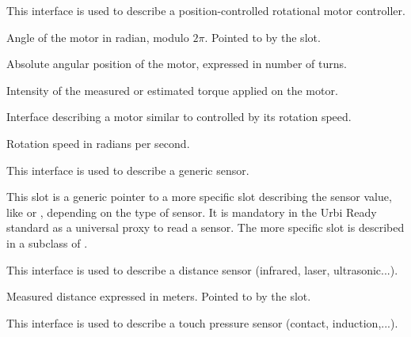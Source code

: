 

This interface is used to describe a position-controlled rotational motor controller.

\begin{slots}
  {%
    Angle of the motor in radian, modulo $2\pi$. Pointed to by the
     slot.%
  }

  {%
    Absolute angular position of the motor, expressed in number of
    turns.%
  }

  {%
    Intensity of the measured or estimated torque applied on the
    motor.%
  }

\end{slots}


Interface describing a motor similar to  controlled
by its rotation speed.

\begin{slots}
   {%
     Rotation speed in radians per second.%
   }
\end{slots}


This interface is used to describe a generic sensor.

\begin{slots}
  {%
    This slot is a generic pointer to a more specific slot describing
    the sensor value, like  or ,
    depending on the type of sensor. It is mandatory in the Urbi Ready
    standard as a universal proxy to read a sensor. The more specific
    slot is described in a subclass of .%
  }

\end{slots}



This interface is used to describe a distance sensor (infrared, laser,
ultrasonic...).

\begin{slots}
  {%
    Measured distance expressed in meters.  Pointed to by the
     slot.%
  }

\end{slots}



This interface is used to describe a touch pressure sensor (contact,
induction,...).

